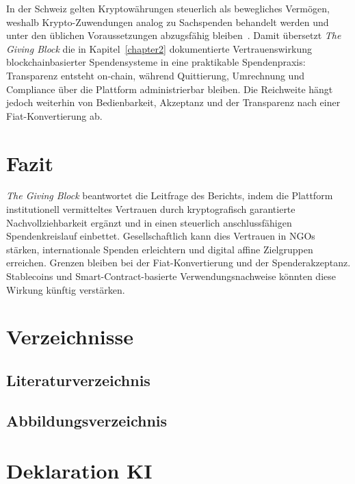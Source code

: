 In der Schweiz gelten Kryptowährungen steuerlich als bewegliches Vermögen, weshalb Krypto-Zuwendungen analog zu Sachspenden behandelt werden und unter den üblichen Voraussetzungen abzugsfähig bleiben~\cite{ESTV2022}. Damit übersetzt \emph{The Giving Block} die in Kapitel~\ref{chapter2} dokumentierte Vertrauenswirkung blockchainbasierter Spendensysteme in eine praktikable Spendenpraxis: Transparenz entsteht on-chain, während Quittierung, Umrechnung und Compliance über die Plattform administrierbar bleiben. Die Reichweite hängt jedoch weiterhin von Bedienbarkeit, Akzeptanz und der Transparenz nach einer Fiat-Konvertierung ab.



\chapter{Fazit}
\label{chapter4}

\emph{The Giving Block} beantwortet die Leitfrage des Berichts, indem die Plattform institutionell vermitteltes Vertrauen durch kryptografisch garantierte Nachvollziehbarkeit ergänzt und in einen steuerlich anschlussfähigen Spendenkreislauf einbettet. Gesellschaftlich kann dies Vertrauen in NGOs stärken, internationale Spenden erleichtern und digital affine Zielgruppen erreichen. Grenzen bleiben bei der Fiat-Konvertierung und der Spenderakzeptanz. Stablecoins und Smart-Contract-basierte Verwendungsnachweise könnten diese Wirkung künftig verstärken.

\newpage
\vspace*{-3em}
\chapter{Verzeichnisse}

\section*{Literaturverzeichnis}
\printbibliography[heading=none]

\section*{Abbildungsverzeichnis}
\makeatletter{}\makeatother



\chapter{Deklaration KI}
\label{chapter5}

